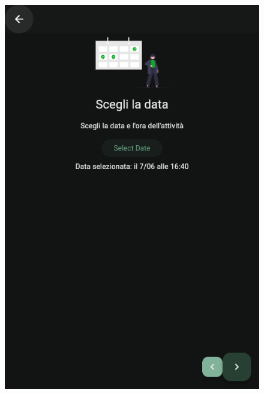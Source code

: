 \documentclass[a4paper,12pt]{article}
\begin{document}
\begin{figure}[H]
\begin{minipage}{0.32\textwidth}
        \includegraphics[width=1\linewidth]{img/new_date.png}
    \end{minipage}
    \begin{minipage}{0.32\textwidth}
        \centering

\end{minipage}
\end{figure}
\end{document}
